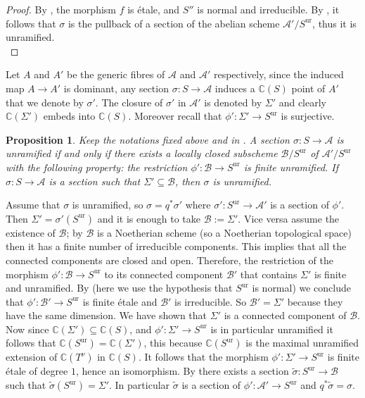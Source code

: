 \documentclass[10 pt,a4paper]{article}
\theoremstyle{plain}
\newtheorem{prop}[thm]{Proposition}
\theoremstyle{definition}
\theoremstyle{named}
\DeclareMathOperator{\ur}{ur}
\newcommand{\cA}{\mathcal A}
\begin{document}
\begin{proof}
    By \cite[Exposé I, Corollaire~9.11]{SGA1}, the morphism $f$ is étale, and $S''$ is normal and irreducible. By \cite[Exposé I, Corollaire~10.2 and Corollaire~10.3]{SGA1}, it follows that $\sigma$ is the pullback of a section of the abelian scheme $\cA'/S^{\ur}$, thus it is unramified.\\
\end{proof}

Let $A$ and $A'$ be the generic fibres of $\mathcal A$ and $\mathcal A'$ respectively, since the induced map $ A\to A'$ is dominant, any section $\sigma:S\to\mathcal A$ induces a $\mathbb C(S)$ point of $A'$ that we denote by $\sigma'$. The closure of $\sigma'$ in $\mathcal A'$ is denoted by $\Sigma'$ and clearly $\mathbb C(\Sigma')$ embeds into $\mathbb C(S)$. Moreover recall that $\phi'\colon \Sigma'\to S^{\ur}$ is surjective.

\begin{prop}\label{prop:tor_ram}
Keep the notations fixed above and in .  A section $\sigma\colon S\to\mathcal A$ is unramified 
if and only if there exists a locally closed subscheme $\mathcal B/S^{\ur}$  of $\cA'/S^{\ur}$ with the following property: the restriction $\phi': \mathcal B \to S^{\ur}$ is finite unramified. If $\sigma: S \to \cA$ is a section such that $\Sigma'\subseteq\mathcal B$, then $\sigma$ is unramified.
\end{prop}

\proof
  Assume that $\sigma$ is unramified, so $\sigma=q^\ast\sigma'$ where $\sigma'\colon S^{\ur}\to \mathcal A'$ is  a section of $\phi'$. Then $\Sigma'=\sigma'(S^{\ur})$ and it is enough to take $\mathcal B:=\Sigma'$. Vice versa assume the existence of $\mathcal B$; by \cite[Tag 02IK]{stacks-project}  $\mathcal B$ is a Noetherian scheme (so a Noetherian topological space) then it has a finite number of irreducible components. This implies that all the connected components are closed and open. Therefore, the restriction of the morphism $\phi'\colon\mathcal B \to S^{\ur}$ to its connected component $\mathcal B'$ that contains $ \Sigma'$  is finite and unramified.  By \cite[Tag 0GS9]{stacks-project} (here we use the hypothesis that  $S^{\ur}$ is normal) we conclude that $\phi':\mathcal B'\to S^{\ur}$ is finite étale  and $\mathcal B'$ is irreducible. So $\mathcal B'=\Sigma'$ because they have the same dimension. We have shown that $\Sigma'$ is a connected component of $\mathcal B$. Now since $\mathbb C(\Sigma')\subseteq\mathbb C(S)$,  and $\phi':\Sigma'\to S^{\ur}$ is in particular unramified it follows that $\mathbb C(S^{\ur})=\mathbb C(\Sigma')$, this because $\mathbb C(S^{\ur})$ is the maximal unramified extension of $\mathbb C(T^{\nu})$ in $\mathbb C(S)$. It follows that  the morphism $\phi'\colon\Sigma'\to S^{\ur}$ is finite étale of degree $1$, hence an isomorphism. By \cite[Tag 024U]{stacks-project} there exists a section $\widetilde{\sigma}\colon S^{\ur}\to\mathcal B$ such that $\widetilde{\sigma}(S^{\ur})=\Sigma'$. In particular $\widetilde{\sigma}$ is a section of $\phi':\mathcal A'\to S^{\ur}$ and $q^\ast\widetilde{\sigma}=\sigma$.
\endproof
\end{document}

